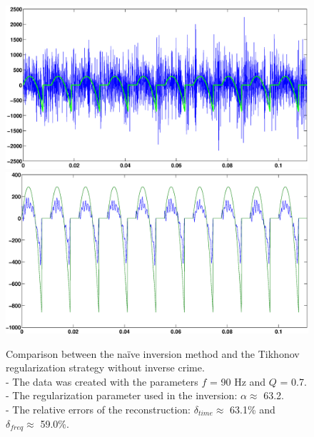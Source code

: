 \documentclass[12pt,a4]{article}
\newcommand{\inversionresult}[5]{\\
 - The data was created with the parameters $f$ = #1 Hz and $Q$ = #2.\\
 - The regularization parameter used in the inversion: $\alpha \approx$ #3.\\
 - The relative errors of the reconstruction: $\delta_{time} \approx$ #4\% and $\delta_{freq} \approx$ #5\%.}
\begin{document}
\begin{figure}[H]
\begin{center}
\includegraphics[scale=.3]{img/naive_test_naive[V3].eps}
\includegraphics[scale=.3]{img/naive_test_morozov[V3].eps}
\end{center}
\caption{Comparison between the naïve inversion method and the Tikhonov regularization strategy without inverse crime. \inversionresult{90}{0.7}{63.2}{63.1}{59.0}}
\label{fig:naive-comparison_nocrime}
\end{figure}
\end{document}
